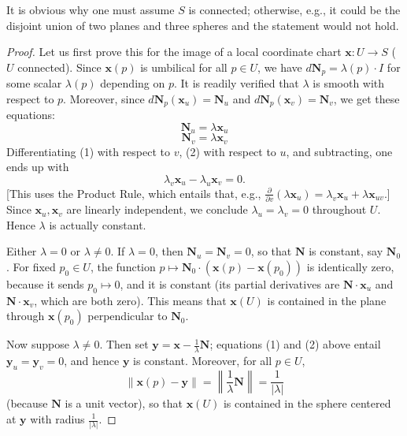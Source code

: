 \documentclass[leqno]{book}
\begin{document}
\noindent It is obvious why one must assume $S$ is connected; otherwise, e.g., it could be the disjoint union of two planes and three spheres and the statement would not hold.
\begin{proof}
Let us first prove this for the image of a local coordinate chart $\mathbf x:U\to S$ ($U$ connected).  Since $\mathbf x(p)$ is umbilical for all $p\in U$, we have $d\mathbf N_p=\lambda(p)\cdot I$ for some scalar $\lambda(p)$ depending on $p$.  It is readily verified that $\lambda$ is smooth with respect to $p$.  Moreover, since $d\mathbf N_p(\mathbf x_u)=\mathbf N_u$ and $d\mathbf N_p(\mathbf x_v)=\mathbf N_v$, we get these equations:
\begin{equation}\tag{1}\mathbf N_u=\lambda\mathbf x_u\end{equation}
\begin{equation}\tag{2}\mathbf N_v=\lambda\mathbf x_v\end{equation}
Differentiating (1) with respect to $v$, (2) with respect to $u$, and subtracting, one ends up with
$$\lambda_v\mathbf x_u-\lambda_u\mathbf x_v=0.$$
[This uses the Product Rule, which entails that, e.g., $\frac{\partial}{\partial v}(\lambda\mathbf x_u)=\lambda_v\mathbf x_u+\lambda\mathbf x_{uv}$.]  Since $\mathbf x_u,\mathbf x_v$ are linearly independent, we conclude $\lambda_u=\lambda_v=0$ throughout $U$.  Hence $\lambda$ is actually constant.

Either $\lambda=0$ or $\lambda\ne 0$.  If $\lambda=0$, then $\mathbf N_u=\mathbf N_v=0$, so that $\mathbf N$ is constant, say $\mathbf N_0$.  For fixed $p_0\in U$, the function $p\mapsto\mathbf N_0\cdot(\mathbf x(p)-\mathbf x(p_0))$ is identically zero, because it sends $p_0\mapsto 0$, and it is constant (its partial derivatives are $\mathbf N\cdot\mathbf x_u$ and $\mathbf N\cdot\mathbf x_v$, which are both zero).  This means that $\mathbf x(U)$ is contained in the plane through $\mathbf x(p_0)$ perpendicular to $\mathbf N_0$.

Now suppose $\lambda\ne 0$.  Then set $\mathbf y=\mathbf x-\frac 1{\lambda}\mathbf N$; equations (1) and (2) above entail $\mathbf y_u=\mathbf y_v=0$, and hence $\mathbf y$ is constant.  Moreover, for all $p\in U$,
$$\left\|\mathbf x(p)-\mathbf y\right\|=\left\|\frac 1{\lambda}\mathbf N\right\|=\frac 1{|\lambda|}$$
(because $\mathbf N$ is a unit vector), so that $\mathbf x(U)$ is contained in the sphere centered at $\mathbf y$ with radius $\frac 1{|\lambda|}$.


\end{proof}
\end{document}
